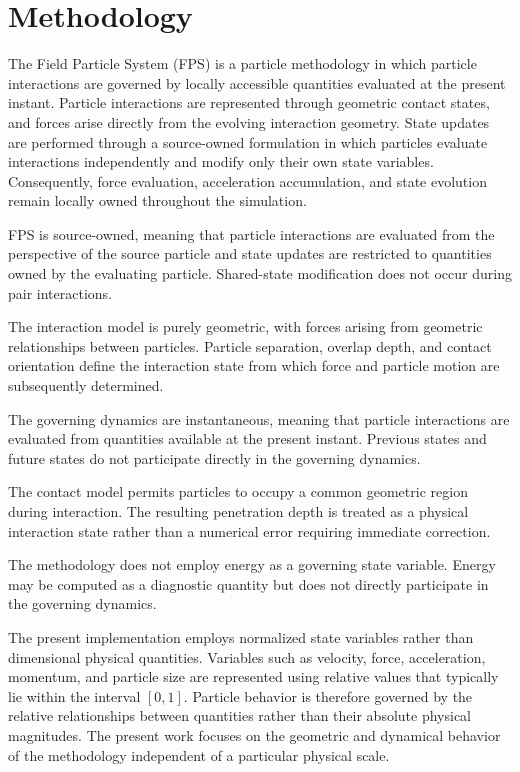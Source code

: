 \section{Methodology}

The Field Particle System (FPS) is a particle methodology
in which particle interactions are governed by locally
accessible quantities evaluated at the present instant.
Particle interactions are represented through geometric
contact states, and forces arise directly from the
evolving interaction geometry. State updates are
performed through a source-owned formulation in which
particles evaluate interactions independently and modify
only their own state variables. Consequently, force
evaluation, acceleration accumulation, and state
evolution remain locally owned throughout the simulation.

FPS is source-owned, meaning that particle interactions are evaluated from the 
perspective of the source particle and state updates are restricted to quantities 
owned by the evaluating particle. Shared-state modification does not occur 
during pair interactions.

The interaction model is purely geometric, with
forces arising from geometric relationships between
particles. Particle separation, overlap depth, and
contact orientation define the interaction state
from which force and particle motion are
subsequently determined.

The governing dynamics are instantaneous, meaning that
particle interactions are evaluated from quantities
available at the present instant. Previous states and
future states do not participate directly in the
governing dynamics.

The contact model permits particles to occupy a common
geometric region during interaction. The resulting
penetration depth is treated as a physical interaction
state rather than a numerical error requiring immediate
correction.

The methodology does not employ energy as a governing
state variable. Energy may be computed as a diagnostic
quantity but does not directly participate in the
governing dynamics.

The present implementation employs normalized state variables 
rather than dimensional physical quantities. Variables such as 
velocity, force, acceleration, momentum, and particle size are 
represented using relative values that typically lie within the 
interval $[0,1]$. Particle behavior is therefore governed by the 
relative relationships between quantities rather than their absolute 
physical magnitudes. The present work focuses on the geometric 
and dynamical behavior of the methodology independent of a 
particular physical scale.

